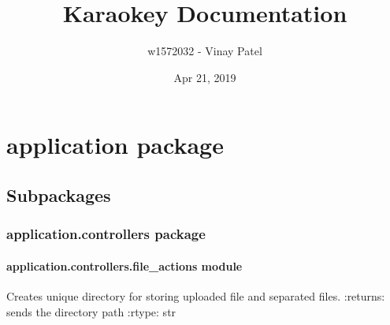 \documentclass[letterpaper,10pt,english,openany,oneside]{sphinxmanual}
\title{Karaokey Documentation}
\date{Apr 21, 2019}
\author{w1572032 - Vinay Patel}
\begin{document}
\pagestyle{empty}
\sphinxmaketitle
\pagestyle{plain}
\sphinxtableofcontents
\pagestyle{normal}
\label{\detokenize{index::doc}}



\chapter{application package}
\label{\detokenize{docs/source/application:application-package}}\label{\detokenize{docs/source/application::doc}}

\section{Subpackages}
\label{\detokenize{docs/source/application:subpackages}}

\subsection{application.controllers package}
\label{\detokenize{docs/source/application.controllers:application-controllers-package}}\label{\detokenize{docs/source/application.controllers::doc}}

\subsubsection{application.controllers.file\_actions module}
\label{\detokenize{docs/source/application.controllers:module-application.controllers.file_actions}}\label{\detokenize{docs/source/application.controllers:application-controllers-file-actions-module}}

\begin{fulllineitems}
\label{\detokenize{docs/source/application.controllers:application.controllers.file_actions.create_unique_dir}}
Creates unique directory for storing uploaded file and separated files.
:returns: sends the directory path
:rtype: str

\end{fulllineitems}

\end{document}
